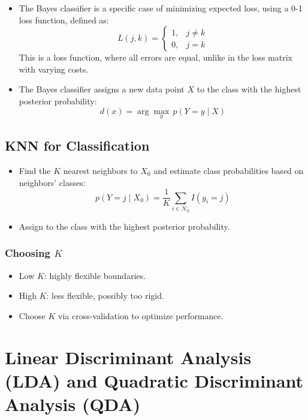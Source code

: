 \documentclass{article}
\begin{document}
\begin{itemize}
  \item The Bayes classifier is a specific case of minimizing expected loss, using a 0-1 loss function, defined as:
  \[
  L(j, k) = \begin{cases} 1, & j \neq k \\ 0, & j = k \end{cases}
  \]
  This is a loss function, where all errors are equal, unlike in the loss matrix with varying costs.
  
  \item The Bayes classifier assigns a new data point $X$ to the class with the highest posterior probability:
  \[
  d(x) = \arg\max_y \, p(Y = y \mid X)
  \]
\end{itemize}

\subsection{KNN for Classification}

\begin{itemize}
  \item Find the $K$ nearest neighbors to $X_0$ and estimate class probabilities based on neighbors' classes:
  \[
  p(Y = j \mid X_0) = \frac{1}{K} \sum_{i \in \mathcal{N}_0} I(y_i = j)
  \]
  \item Assign to the class with the highest posterior probability.
\end{itemize}

\subsubsection{Choosing $K$}

\begin{itemize}
  \item Low $K$: highly flexible boundaries.
  \item High $K$: less flexible, possibly too rigid.
  \item Choose $K$ via cross-validation to optimize performance.
\end{itemize}

\section{Linear Discriminant Analysis (LDA) and Quadratic Discriminant Analysis (QDA)}
\end{document}
